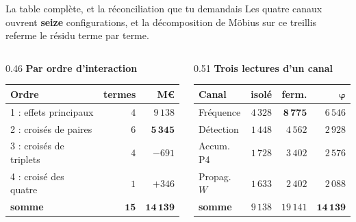 \documentclass[11pt]{beamer}
\begin{document}
\begin{frame}{La table complète, et la réconciliation que tu demandais}
\scriptsize
Les quatre canaux ouvrent \textbf{seize} configurations, et la décomposition de Möbius sur ce
treillis referme le résidu terme par terme.
\vspace{-1mm}
\begin{columns}[t]
\begin{column}{0.46\linewidth}
\centering
\textbf{Par ordre d'interaction}\\[3pt]
\begin{tabular}{@{}l r r@{}}
\toprule
\textbf{Ordre} & \textbf{termes} & \textbf{M\euro} \\
\midrule
1 : effets principaux & $4$ & $9\,138$ \\
2 : croisés de paires & $6$ & $\mathbf{5\,345}$ \\
3 : croisés de triplets & $4$ & $-691$ \\
4 : croisé des quatre & $1$ & $+346$ \\
\midrule
\textbf{somme} & $\mathbf{15}$ & $\mathbf{14\,139}$ \\
\bottomrule
\end{tabular}
\end{column}
\begin{column}{0.51\linewidth}
\centering
\textbf{Trois lectures d'un canal}\\[3pt]
\begin{tabular}{@{}l r r r@{}}
\toprule
\textbf{Canal} & \textbf{isolé} & \textbf{ferm.} & $\boldsymbol{\varphi}$ \\
\midrule
Fréquence & $4\,328$ & $\mathbf{8\,775}$ & $6\,546$ \\
Détection & $1\,448$ & $4\,562$ & $2\,928$ \\
Accum. P4 & $1\,728$ & $3\,402$ & $2\,576$ \\
Propag. $W$ & $1\,633$ & $2\,402$ & $2\,088$ \\
\midrule
\textbf{somme} & $9\,138$ & $19\,141$ & $\mathbf{14\,139}$ \\
\bottomrule
\end{tabular}
\end{column}
\end{columns}
\vspace{1mm}

\end{frame}
\end{document}
